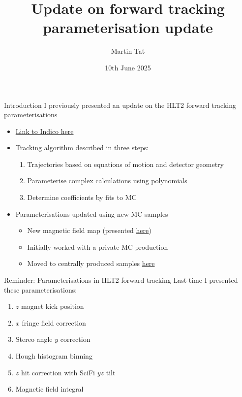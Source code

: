 \documentclass[xcolor={dvipsnames}]{beamer}
\title[RTA WP2 meeting]{Update on forward tracking parameterisation update}
\author[Martin Tat]{Martin Tat}
\institute[Heidelberg]{Heidelberg University}
\date{10th June 2025}
\begin{document}
\begin{frame}
  \titlepage
\end{frame}


\begin{frame}{Introduction}
  \vspace{0.0cm}
  {\Large I previously presented an update on the HLT2 forward tracking parameterisations}
  \vspace{0.5cm}
  \begin{itemize}
    \setlength\itemsep{1.0em}
    \item{\href{https://indico.cern.ch/event/1541826/\#13-update-of-pattern-recogniti}{Link to Indico here}}
    \item{Tracking algorithm described in three steps:}
    \begin{enumerate}
      \item{Trajectories based on equations of motion and detector geometry}
      \item{Parameterise complex calculations using polynomials}
      \item{Determine coefficients by fits to MC}
    \end{enumerate}
    \item{Parameterisations updated using new MC samples}
    \begin{itemize}
      \item{New magnetic field map (presented \href{https://indico.cern.ch/event/1539235/\#3-update-magnetic-field-map}{here})}
      \item{Initially worked with a private MC production}
      \item{Moved to centrally produced samples \href{https://gitlab.cern.ch/lhcb-simulation/mc-requests/-/merge_requests/1208}{here}}
    \end{itemize}
  \end{itemize}
\end{frame}

\begin{frame}{Reminder: Parameterisations in HLT2 forward tracking}
  \vspace{0.0cm}
  {\large Last time I presented these parameterisations:}
  \vspace{0.2cm}
  \begin{enumerate}
    \setlength\itemsep{0.5em}
    \item{$z$ magnet kick position}
    \item{$x$ fringe field correction}
    \item{Stereo angle $y$ correction}
    \item{Hough histogram binning}
    \item{$z$ hit correction with SciFi $yz$ tilt}
    \item{Magnetic field integral}
  \end{enumerate}
\end{frame}
\end{document}

